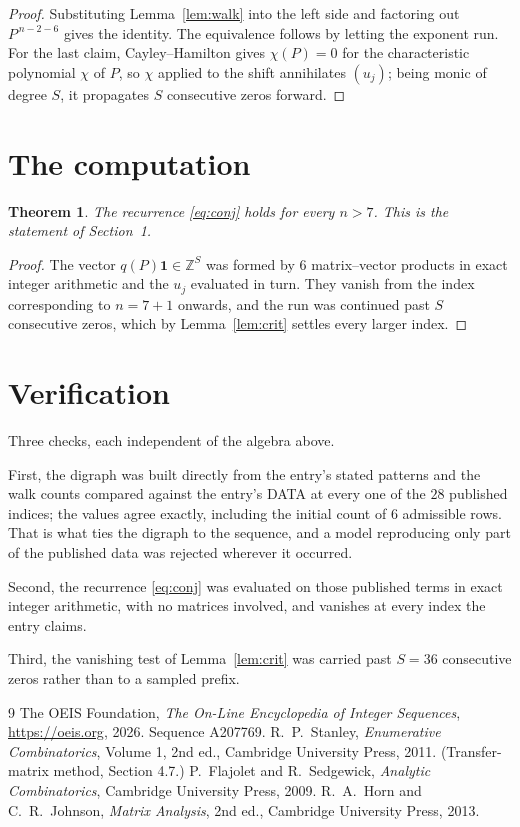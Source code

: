\documentclass[11pt,a4paper]{article}
\theoremstyle{plain}
\newtheorem{theorem}{Theorem}
\theoremstyle{definition}
\begin{document}
\begin{proof}
Substituting Lemma~\ref{lem:walk} into the left side and factoring out
$P^{\,n-2-6}$ gives the identity. The equivalence follows by letting the exponent
run. For the last claim, Cayley--Hamilton gives $\chi(P)=0$ for the characteristic
polynomial $\chi$ of $P$, so $\chi$ applied to the shift annihilates $(u_j)$; being monic of
degree $S$, it propagates $S$ consecutive zeros forward.
\end{proof}

\section{The computation}

\begin{theorem}
The recurrence \eqref{eq:conj} holds for every $n>7$. This is the statement of
Section~1.
\end{theorem}

\begin{proof}
The vector $q(P)\mathbf{1}\in\mathbb{Z}^{S}$ was formed by $6$ matrix--vector
products in exact integer arithmetic and the $u_j$ evaluated in turn. They vanish from the
index corresponding to $n=7+1$ onwards, and the run was continued past $S$ consecutive
zeros, which by Lemma~\ref{lem:crit} settles every larger index.
\end{proof}

\section{Verification}

Three checks, each independent of the algebra above.

First, the digraph was built directly from the entry's stated patterns and the walk counts
compared against the entry's DATA at every one of the $28$ published indices; the
values agree exactly, including the initial count of $6$ admissible rows. That is
what ties the digraph to the sequence, and a model reproducing only part of the published
data was rejected wherever it occurred.

Second, the recurrence \eqref{eq:conj} was evaluated on those published terms in exact
integer arithmetic, with no matrices involved, and vanishes at every index the entry claims.

Third, the vanishing test of Lemma~\ref{lem:crit} was carried past $S=36$ consecutive
zeros rather than to a sampled prefix.

\begin{thebibliography}{9}
 The OEIS Foundation, \emph{The On-Line Encyclopedia of Integer
Sequences}, \url{https://oeis.org}, 2026. Sequence A207769.
 R.~P.~Stanley, \emph{Enumerative Combinatorics}, Volume 1, 2nd ed.,
Cambridge University Press, 2011. (Transfer-matrix method, Section 4.7.)
 P.~Flajolet and R.~Sedgewick, \emph{Analytic Combinatorics}, Cambridge
University Press, 2009.
 R.~A.~Horn and C.~R.~Johnson, \emph{Matrix Analysis}, 2nd ed., Cambridge
University Press, 2013.
\end{thebibliography}
\end{document}
